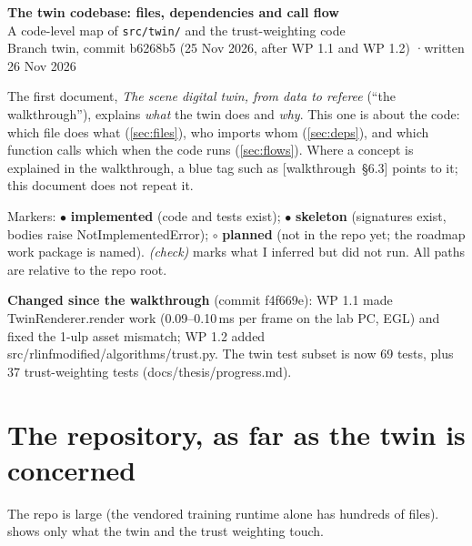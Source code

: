 \documentclass[11pt,a4paper]{article}
\newcommand{\done}{\textcolor{okgreen}{\textbf{implemented}}}
\newcommand{\skel}{\textcolor{skelamber}{\textbf{skeleton}}}
\newcommand{\planned}{\textcolor{plangray}{\textbf{planned}}}
\newcommand{\chk}{\textit{(check)}}
\newcommand{\code}[1]{{\small\ttfamily\begingroup\def\_{\textunderscore\allowbreak}\def\/{/\allowbreak}#1\endgroup}}
\newcommand{\wt}[1]{\textcolor{blue!60!black}{\small[walkthrough~§#1]}}
\newcommand{\gdot}{\textcolor{okgreen}{$\bullet$}}
\newcommand{\sdot}{\textcolor{skelamber}{$\bullet$}}
\newcommand{\pdot}{\textcolor{plangray}{$\circ$}}
\begin{document}
\begin{center}
{\LARGE\bfseries\color{navy} The twin codebase: files, dependencies and call flow}\\[6pt]
{\large\color{navy} A code-level map of \texttt{src/twin/} and the trust-weighting code}\\[8pt]
{\color{gray} Branch \code{twin}, commit \code{b6268b5} (25 Nov 2026, after WP 1.1 and WP 1.2) \quad·\quad written 26 Nov 2026}
\end{center}

\begin{keybox}[title={\textbf{What this document is}},fonttitle=\color{white}\bfseries,colbacktitle=blue!60!black]
The first document, \emph{The scene digital twin, from data to referee} (``the walkthrough''), explains \emph{what} the twin does and \emph{why}. This one is about the code: which file does what (\cref{sec:files}), who imports whom (\cref{sec:deps}), and which function calls which when the code runs (\cref{sec:flows}). Where a concept is explained in the walkthrough, a blue tag such as \wt{6.3} points to it; this document does not repeat it.

Markers: \gdot{} \done{} (code and tests exist); \sdot{} \skel{} (signatures exist, bodies raise \code{NotImplementedError}); \pdot{} \planned{} (not in the repo yet; the roadmap work package is named). \chk{} marks what I inferred but did not run. All paths are relative to the repo root.

\textbf{Changed since the walkthrough} (commit \code{f4f669e}): WP 1.1 made \code{TwinRenderer.render} work (0.09--0.10\,ms per frame on the lab PC, EGL) and fixed the 1-ulp asset mismatch; WP 1.2 added \code{src/rlinf\_modified/algorithms/trust.py}. The twin test subset is now 69 tests, plus 37 trust-weighting tests (\code{docs/thesis/progress.md}).
\end{keybox}

\tableofcontents
\newpage

\section{The repository, as far as the twin is concerned}\label{sec:tree}
The repo is large (the vendored training runtime alone has hundreds of files).  shows only what the twin and the trust weighting touch.
\end{document}
